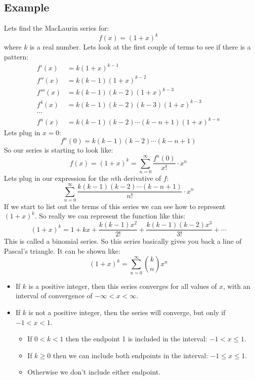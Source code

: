 \documentclass{report}
\begin{document}
    \subsection{Example}
        Lets find the MacLaurin series for:
        \[f(x) = (1 + x)^k\]
        where \(k\) is a real number.
        Lets look at the first couple of terms to see if there is a pattern:
        \begin{align*}
            f'(x) &= k(1 + x)^{k-1} \\
            f''(x) &= k(k-1)(1+x)^{k-2} \\
            f'''(x) &= k(k-1)(k-2)(1+x)^{k-3} \\
            f^4(x) &= k(k-1)(k-2)(k-3)(1+x)^{k-3} \\
            \cdots \\
            f^n(x) &= k(k-1)(k-2) \cdots (k-n+1) (1+x)^{k-n}
        \end{align*}
        Lets plug in \(x = 0\):
        \[f^n(0) = k(k-1)(k-2) \cdots (k-n+1)\]
        So our series is starting to look like:
        \[f(x) = (1 + x)^k = \sum_{n=0}^{\infty} \frac{f^n(0)}{x!} \cdot x^n\]
        Lets plug in our expression for the \(n\)th derivative of \(f\):
        \[\sum_{n=0}^{\infty} \frac{k(k-1)(k-2) \cdots (k-n+1)}{n!} \cdot x^n\]
        If we start to list out the terms of this series we can see how to represent \((1+x)^k\).
        So really we can represent the function like this:
        \[(1+x)^k = 1 + kx + \frac{k(k-1)x^2}{2!} + \frac{k(k-1)(k-2)x^3}{3!} + \cdots\]
        This is called a binomial series.
        So this series basically gives you back a line of Pascal's triangle.
        It can be shown like:
        \[(1+x)^k = \sum_{n=0}^{\infty} \binom{k}{n} x^n\]
        \begin{itemize}
            \item If \(k\) is a positive integer, then this series converges for all values of \(x\), with an interval of convergence of \(- \infty < x < \infty\).
            \item If \(k\) is not a positive integer, then the series will converge, but only if \(-1 < x < 1\).
            \begin{itemize}
                \item If \(0 < k < 1\) then the endpoint 1 is included in the interval: \(-1 < x \leq 1\).
                \item If \(k \geq 0\) then we can include both endpoints in the interval: \(-1 \leq x \leq 1\).
                \item Otherwise we don't include either endpoint.
            \end{itemize}
        \end{itemize}
    
\end{document}
